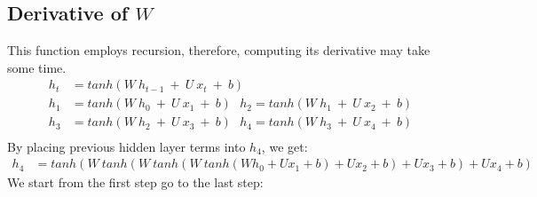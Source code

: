 \documentclass{article}
\begin{document}
\subsection{Derivative of $W$}
This function employs recursion, therefore, computing its derivative may take some time.
\begin{align*}
	h_t &= tanh(W ~h_{t-1}~+~U~x_t ~+~b)\\
	h_1 & = tanh(W ~h_{0}~+~U~x_1 ~+~b) ~~~ h_2 = tanh(W ~h_{1}~+~U~x_2 ~+~b)\\
	h_3 &= tanh(W ~h_{2}~+~U~x_3 ~+~b)~~~h_4 = tanh(W ~h_{3}~+~U~x_4 ~+~b)\\
\end{align*}
By placing previous hidden layer terms into $h_4$, we get:
\begin{align*}
	h_4 &= tanh(W ~tanh(W ~tanh(W ~tanh(W h_{0}+Ux_1 +b)+Ux_2 +b)+Ux_3 +b) +Ux_4 +b)
\end{align*}
We start from the first step go to the last step:
\end{document}
